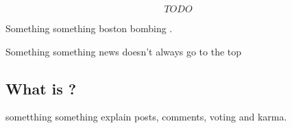 \[TODO\]

Something something boston bombing \cite{Potts:2013:IRC:2507065.2507079}.

Something something news doesn't always go to the top \cite{Gilbert:2013:WUR:2441776.2441866}

\subsection{What is \reddit{}?} %
\label{sub:what_is_reddit}
sometthing something explain posts, comments, voting and karma.
